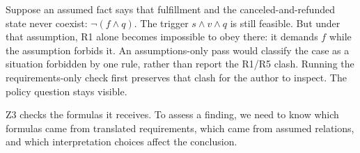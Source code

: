 Suppose an assumed fact says that fulfillment and the canceled-and-refunded state never coexist: $\neg(f\land q)$. The trigger $s\land v\land q$ is still feasible. But under that assumption, R1 alone becomes impossible to obey there: it demands $f$ while the assumption forbids it. An assumptions-only pass would classify the case as a situation forbidden by one rule, rather than report the R1/R5 clash. Running the requirements-only check first preserves that clash for the author to inspect. The policy question stays visible.

Z3 checks the formulas it receives. To assess a finding, we need to know which formulas came from translated requirements, which came from assumed relations, and which interpretation choices affect the conclusion.

